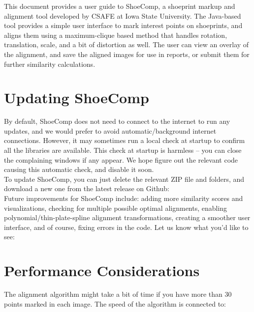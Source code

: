 \documentclass{csafedoc}
\begin{document}
This document provides a user guide to ShoeComp, a shoeprint markup and alignment tool
developed by CSAFE at Iowa State University. The Java-based tool provides a simple user
interface to mark interest points on shoeprints, and aligns them using a maximum-clique
based method that handles rotation, translation, scale, and a bit of distortion as well.
The user can view an overlay of the alignment, and save the aligned images for use in
reports, or submit them for further similarity calculations.

\section{Updating ShoeComp}

By default, ShoeComp does not need to connect to the internet to run any updates, and we
would prefer to avoid automatic/background internet connections. However, it may sometimes
run a local check at startup to confirm all the libraries are available. This check at
startup is harmless -- you can close the complaining windows if any appear. We hope figure
out the relevant code causing this automatic check, and disable it soon. \\

To update ShoeComp, you can just delete the relevant ZIP file and folders, and download a
new one from the latest release on Github: 
\\

Future improvements for ShoeComp include: adding more similarity scores and visualizations,
checking for multiple possible optimal alignments, enabling polynomial/thin-plate-spline
alignment transformations, creating a smoother user interface, and of course, fixing
errors in the code. Let us know what you'd like to see:

\section{Performance Considerations}

The alignment algorithm might take a bit of time if you have more than 30 points marked in
each image. The speed of the algorithm is connected to:
\end{document}
